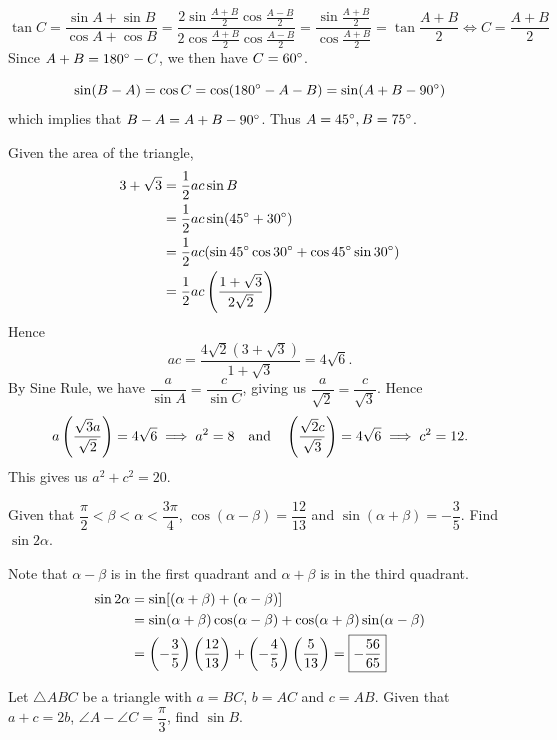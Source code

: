 \begin{solution}
\[ \tan C=\frac{\sin A+\sin B}{\cos A+\cos B}=\frac{2\sin\frac{A+B}{2}\cos\frac{A-B}{2}}{2\cos\frac{A+B}{2}\cos\frac{A-B}{2}}=\frac{\sin\frac{A+B}{2}}{\cos\frac{A+B}{2}}=\tan\frac{A+B}{2} \iff C=\frac{A+B}{2} \]
Since $A+B=180\degree-C$, we then have $C=60\degree$.

\[ \sin(B-A)=\cos C=\cos(180\degree-A-B)=\sin(A+B-90\degree) \]
which implies that $B-A=A+B-90\degree$. Thus $A=45\degree, B=75\degree$.

Given the area of the triangle,
\begin{align*}
3+\sqrt{3}&=\frac{1}{2}ac\sin B\\
&=\frac{1}{2}ac\sin(45\degree+30\degree) \\
&= \frac{1}{2}ac(\sin45\degree\cos30\degree+\cos45\degree\sin30\degree)\\
&=\frac{1}{2}ac\left(\frac{1+\sqrt{3}}{2\sqrt{2}}\right)
\end{align*}
Hence
\[ ac=\frac{4\sqrt{2}(3+\sqrt{3})}{1+\sqrt{3}}=4\sqrt{6}. \]
By Sine Rule, we have $\dfrac{a}{\sin A}=\dfrac{c}{\sin C}$, giving us $\dfrac{a}{\sqrt{2}}=\dfrac{c}{\sqrt{3}}$. Hence 
\[ a\left(\frac{\sqrt{3}a}{\sqrt{2}}\right)=4\sqrt{6}\implies a^2=8 \quad \text{and} \quad \left(\frac{\sqrt{2}c}{\sqrt{3}}\right)=4\sqrt{6}\implies c^2=12. \]
This gives us $a^2+c^2=20$.
\end{solution}

\begin{prbm}
Given that $\dfrac{\pi}{2}<\beta<\alpha<\dfrac{3\pi}{4}$, $\cos(\alpha-\beta)=\dfrac{12}{13}$ and $\sin(\alpha+\beta)=-\dfrac{3}{5}$. Find $\sin2\alpha$.
\end{prbm}

\begin{solution}
Note that $\alpha-\beta$ is in the first quadrant and $\alpha+\beta$ is in the third quadrant.
\begin{align*}
\sin2\alpha&=\sin[(\alpha+\beta)+(\alpha-\beta)] \\
&=\sin(\alpha+\beta)\cos(\alpha-\beta)+\cos(\alpha+\beta)\sin(\alpha-\beta) \\
&= \left(-\frac{3}{5}\right)\left(\frac{12}{13}\right)+\left(-\frac{4}{5}\right)\left(\frac{5}{13}\right)=\boxed{-\frac{56}{65}}
\end{align*}
\end{solution}

\begin{prbm}
Let $\triangle ABC$ be a triangle with $a=BC$, $b=AC$ and $c=AB$. Given that $a+c=2b$, $\angle A-\angle C=\dfrac{\pi}{3}$, find $\sin B$.
\end{prbm}

